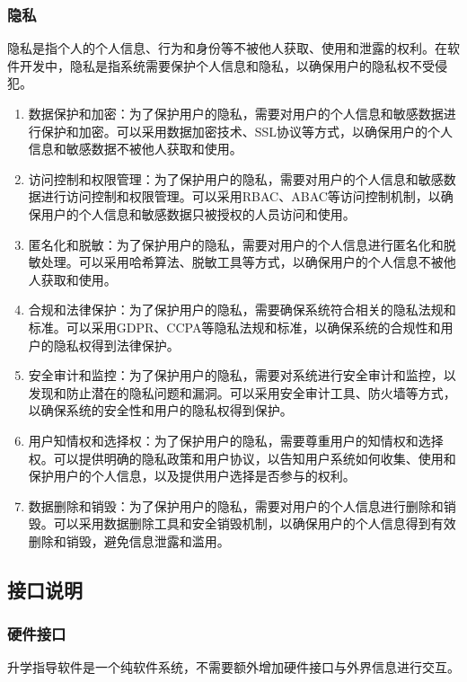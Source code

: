 \documentclass[UTF8]{ctexart}
\newcommand{\ch}[1]{\textcolor{ChatGPT}{#1}}
\newcommand{\m}[1]{\textcolor{modify}{#1}}
\begin{document}
    \subsubsection{隐私}
    \ch{隐私是指个人的个人信息、行为和身份等不被他人获取、使用和泄露的权利。在软件开发中，隐私是指系统需要保护个人信息和隐私，以确保用户的隐私权不受侵犯}。
    \m{
        \begin{enumerate}
            \item 数据保护和加密：为了保护用户的隐私，需要对用户的个人信息和敏感数据进行保护和加密。可以采用数据加密技术、SSL协议等方式，以确保用户的个人信息和敏感数据不被他人获取和使用。
            \item 访问控制和权限管理：为了保护用户的隐私，需要对用户的个人信息和敏感数据进行访问控制和权限管理。可以采用RBAC、ABAC等访问控制机制，以确保用户的个人信息和敏感数据只被授权的人员访问和使用。
            \item 匿名化和脱敏：为了保护用户的隐私，需要对用户的个人信息进行匿名化和脱敏处理。可以采用哈希算法、脱敏工具等方式，以确保用户的个人信息不被他人获取和使用。
            \item 合规和法律保护：为了保护用户的隐私，需要确保系统符合相关的隐私法规和标准。可以采用GDPR、CCPA等隐私法规和标准，以确保系统的合规性和用户的隐私权得到法律保护。
            \item 安全审计和监控：为了保护用户的隐私，需要对系统进行安全审计和监控，以发现和防止潜在的隐私问题和漏洞。可以采用安全审计工具、防火墙等方式，以确保系统的安全性和用户的隐私权得到保护。
            \item 用户知情权和选择权：为了保护用户的隐私，需要尊重用户的知情权和选择权。可以提供明确的隐私政策和用户协议，以告知用户系统如何收集、使用和保护用户的个人信息，以及提供用户选择是否参与的权利。
            \item 数据删除和销毁：为了保护用户的隐私，需要对用户的个人信息进行删除和销毁。可以采用数据删除工具和安全销毁机制，以确保用户的个人信息得到有效删除和销毁，避免信息泄露和滥用。
        \end{enumerate}
    }
    
    \subsection{接口说明}
    \subsubsection{硬件接口}
    升学指导软件是一个纯软件系统，不需要额外增加硬件接口与外界信息进行交互。
\end{document}

